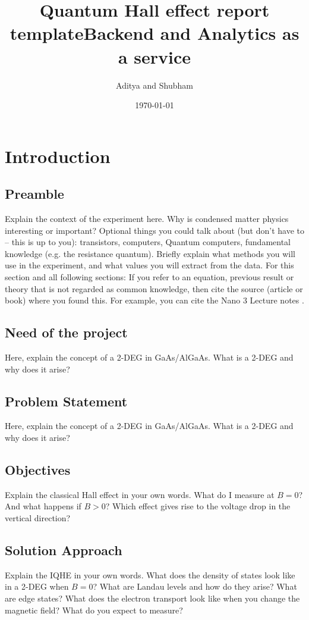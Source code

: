 \documentclass[a4paper]{report}
\title{Quantum Hall effect report template}
\title{Backend and Analytics as a service}
\author{Aditya and Shubham}
\date{\today}
\begin{document}
    
    \begin{titlepage}
      \maketitle 
    \end{titlepage}    
    
    \newpage
    \tableofcontents{}    

    \chapter {Introduction}
    
    \section{Preamble}
    \label{sec:introduction}    
    Explain the context of the experiment here. Why is condensed matter physics interesting or important?
    Optional things you could talk about (but don't have to -- this is up to you): transistors, computers, Quantum computers, fundamental knowledge (e.g. the resistance quantum).    
    Briefly explain what methods you will use in the experiment, and what values you will extract from the data.    
    For this section and all following sections: If you refer to an equation, previous result or theory that is not regarded as common knowledge, then cite the source (article or book) where you found this. For example, you can cite the Nano 3 Lecture notes \cite{nano3}.
    
    \section{Need of the project}
    \label{sec:theory}
    Here, explain the concept of a 2-DEG in GaAs/AlGaAs. What is a 2-DEG and why does it arise?
    \section{Problem Statement}
    Here, explain the concept of a 2-DEG in GaAs/AlGaAs. What is a 2-DEG and why does it arise?
    \section{Objectives}
    Explain the classical Hall effect in your own words. What do I measure at $B=0$? And what happens if $B>0$? Which effect gives rise to the voltage drop in the vertical direction?
    \section{Solution Approach}
    Explain the IQHE in your own words. What does the density of states look like in a 2-DEG when $B=0$? What are Landau levels and how do they arise? What are edge states? What does the electron transport look like when you change the magnetic field? What do you expect to measure?    
\end{document}
